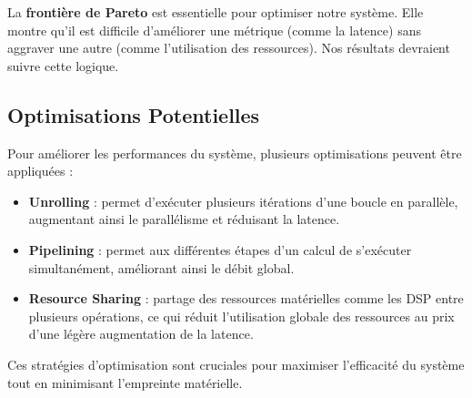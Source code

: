 \documentclass[../CSC_5RO06_TA.tex]{subfiles}
\begin{document}
La \textbf{frontière de Pareto} est essentielle pour optimiser notre système. Elle montre qu'il est difficile d'améliorer une métrique (comme la latence) sans aggraver une autre (comme l'utilisation des ressources). Nos résultats devraient suivre cette logique.

\subsection{Optimisations Potentielles}

Pour améliorer les performances du système, plusieurs optimisations peuvent être appliquées :
\begin{itemize}
    \item \textbf{Unrolling} : permet d'exécuter plusieurs itérations d'une boucle en parallèle, augmentant ainsi le parallélisme et réduisant la latence.
    \item \textbf{Pipelining} : permet aux différentes étapes d'un calcul de s'exécuter simultanément, améliorant ainsi le débit global.
    \item \textbf{Resource Sharing} : partage des ressources matérielles comme les DSP entre plusieurs opérations, ce qui réduit l'utilisation globale des ressources au prix d'une légère augmentation de la latence.
\end{itemize}

Ces stratégies d'optimisation sont cruciales pour maximiser l'efficacité du système tout en minimisant l'empreinte matérielle.
\end{document}
